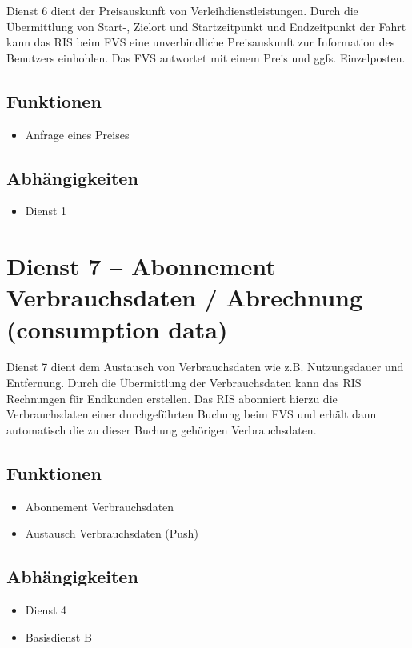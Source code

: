 Dienst 6 dient der Preisauskunft von Verleihdienstleistungen. Durch die Übermittlung von Start-, Zielort und Startzeitpunkt und Endzeitpunkt der Fahrt kann das RIS beim FVS eine unverbindliche Preisauskunft zur Information des Benutzers einhohlen. Das FVS antwortet mit einem Preis und ggfs. Einzelposten.

\subsection*{Funktionen}
\begin{itemize}
\item Anfrage eines Preises
\end{itemize}

\subsection*{Abhängigkeiten}
\begin{itemize}
\item Dienst 1
\end{itemize}


\section{Dienst 7 -- Abonnement Verbrauchsdaten / Abrechnung (consumption data)}
Dienst 7 dient dem Austausch von Verbrauchsdaten wie z.B. Nutzungsdauer und Entfernung. Durch die Übermittlung der Verbrauchsdaten kann das RIS Rechnungen für Endkunden erstellen. Das RIS abonniert hierzu die Verbrauchsdaten einer durchgeführten Buchung beim FVS und erhält dann automatisch die zu dieser Buchung gehörigen Verbrauchsdaten.

\subsection*{Funktionen}
\begin{itemize}
\item Abonnement Verbrauchsdaten
\item Austausch Verbrauchsdaten (Push)
\end{itemize}

\subsection*{Abhängigkeiten}
\begin{itemize}
\item Dienst 4
\item Basisdienst B
\end{itemize}

